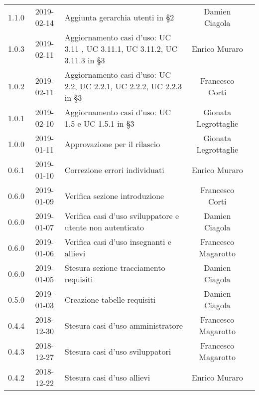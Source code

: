 {\begin{longtable}{ c c C{6cm} c c }
		1.1.0 &
		2019-02-14 &
		Aggiunta gerarchia utenti in §2 &
		Damien Ciagola&
		\reda{} \\
		
		1.0.3 &
		2019-02-11 &
		Aggiornamento casi d'uso: UC 3.11 , UC 3.11.1, UC 3.11.2, UC 3.11.3 in §3 &
		Enrico Muraro&
		\reda{} \\
		
		1.0.2 &
		2019-02-11 &
		Aggiornamento casi d'uso: UC 2.2, UC 2.2.1, UC 2.2.2, UC 2.2.3 in §3 &
		Francesco Corti&
		\reda{} \\

		1.0.1 &
		2019-02-10 &
		Aggiornamento casi d'uso: UC 1.5 e UC 1.5.1 in §3 &
		Gionata Legrottaglie&
		\reda{} \\

		1.0.0 &
		2019-01-11 &
		Approvazione per il rilascio &	
		Gionata Legrottaglie&	
		\Res{} \\
		
		0.6.1 & 
		2019-01-10 &  
		Correzione errori individuati &	
		Enrico Muraro&	
		\reda{} \\
		
		0.6.0 & 
		2019-01-09 &  
		Verifica sezione introduzione &	
		Francesco Corti&	
		\ver{} \\
		
		0.6.0 & 
		2019-01-07 &  
		Verifica casi d'uso sviluppatore e utente non autenticato& 	
		Damien Ciagola  &	
		\ver{} \\
		
		0.6.0 & 
		2019-01-06 &  
		Verifica casi d'uso insegnanti e allievi & 
		Francesco Magarotto  &
		\ver{}  \\
		
		0.6.0 & 
		2019-01-05 &  
		Stesura sezione tracciamento requisiti &	
		Damien Ciagola &	
		\reda{} \\
		
		0.5.0 & 
		2019-01-03 &  
		Creazione tabelle requisiti&	
		Damien Ciagola &	
		\reda{} \\
		
		0.4.4 & 
		2018-12-30 &  
		Stesura casi d'uso amministratore &	
		Francesco Magarotto &	
		\reda{} \\
		
		0.4.3 & 
		2018-12-27 &  
		Stesura casi d'uso sviluppatori &	
		Francesco Magarotto &	
		\reda{} \\
		
		0.4.2 & 
		2018-12-22 &  
		Stesura casi d'uso allievi &	
		Enrico Muraro	&	
		\reda{} \\	
		

\end{longtable}}
